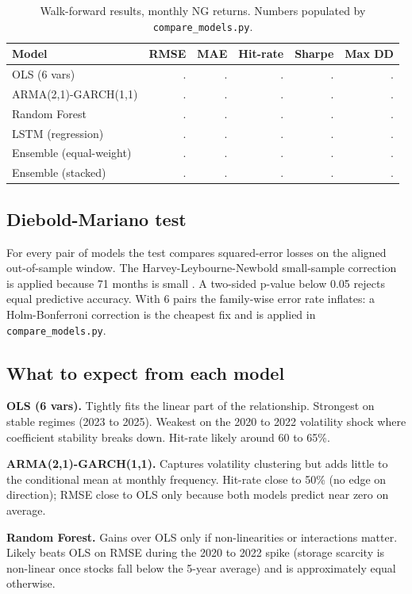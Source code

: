 \documentclass[11pt,letterpaper]{article}
\begin{document}
\begin{table}[h]
\centering
\small
\begin{tabular}{lrrrrr}
\toprule
Model & RMSE & MAE & Hit-rate & Sharpe & Max DD \\
\midrule
OLS (6 vars)         & . & . & . & . & . \\
ARMA(2,1)-GARCH(1,1) & . & . & . & . & . \\
Random Forest        & . & . & . & . & . \\
LSTM (regression)    & . & . & . & . & . \\
\midrule
Ensemble (equal-weight) & . & . & . & . & . \\
Ensemble (stacked)      & . & . & . & . & . \\
\bottomrule
\end{tabular}
\caption{Walk-forward results, monthly NG returns. Numbers populated by \texttt{compare\_models.py}.}
\end{table}

\subsection{Diebold-Mariano test}

For every pair of models the test compares squared-error losses on the aligned out-of-sample window. The Harvey-Leybourne-Newbold small-sample correction is applied because 71 months is small \parencite{harvey1997hln}. A two-sided p-value below 0.05 rejects equal predictive accuracy. With 6 pairs the family-wise error rate inflates: a Holm-Bonferroni correction is the cheapest fix and is applied in \texttt{compare\_models.py}.

\subsection{What to expect from each model}

\textbf{OLS (6 vars).} Tightly fits the linear part of the relationship. Strongest on stable regimes (2023 to 2025). Weakest on the 2020 to 2022 volatility shock where coefficient stability breaks down. Hit-rate likely around 60 to 65\%.

\textbf{ARMA(2,1)-GARCH(1,1).} Captures volatility clustering but adds little to the conditional mean at monthly frequency. Hit-rate close to 50\% (no edge on direction); RMSE close to OLS only because both models predict near zero on average.

\textbf{Random Forest.} Gains over OLS only if non-linearities or interactions matter. Likely beats OLS on RMSE during the 2020 to 2022 spike (storage scarcity is non-linear once stocks fall below the 5-year average) and is approximately equal otherwise.
\end{document}
